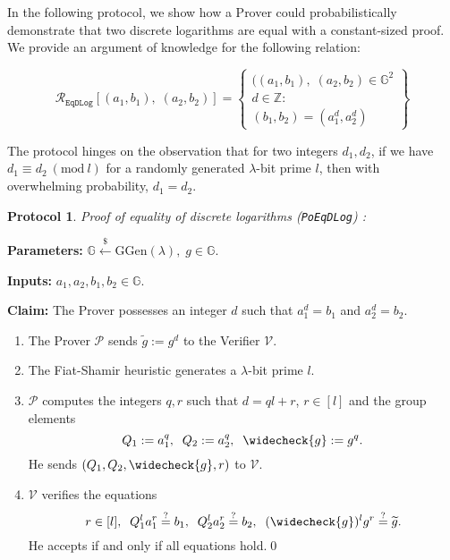 \documentclass[11pt, lettersize, notitlepage, leqno, footskip=0.6cm]{article}
\newcommand{\ttt}{\texttt}
\newcommand{\wti}{\widetilde}
\newcommand{\mc}{\mathcal}
\newcommand{\mb}{\mathbb}
\newcommand{\mr}{\mathrm}
\newcommand{\lam}{\lambda}
\newcommand{\lamb}{\lambda}
\newcommand{\weck}{\widecheck}
\newcommand{\vs}{\vspace{-0.15cm}}
\newcommand{\noin}{\noindent}
\newcommand{\op}{overwhelming probability}
\newcommand{\sta}{\stackrel{?}{=}}
\newcommand{\Mod}[1]{\ (\mathrm{mod}\ #1)}
\newtheorem{Prot}[Thm]{Protocol}
\numberwithin{equation}{section}
\begin{document}
In the following protocol, we show how a Prover could probabilistically demonstrate that two discrete logarithms are equal with a constant-sized proof. We provide an argument of knowledge for  the following relation:

\[
  \mc{R}_{\ttt{EqDLog}}[(a_1, b_1),\;(a_2,b_2)] = \left\{\begin{array}{l}
    ((a_1, b_1),\; (a_2,b_2)\in\mb{G}^2\\
    d\in\mb{Z}: \\
    (b_1,b_2) = (a_1^d,a_2^d)
  \end{array}\right\}
\]

\noin The protocol hinges on the observation that for two integers $d_1,d_2$, if we have $d_1\equiv d_2\Mod{l}$ for a randomly generated $\lam$-bit prime $l$, then with \op, $d_1= d_2$.

\vspace{0.15cm}


\begin{Prot}\label{EqDLog} \normalfont \textit{Proof of equality of discrete logarithms} (\verb|PoEqDLog|) :\end{Prot} \vspace{-0.3cm}

\noindent \textbf{Parameters:} $\mb{G}\xleftarrow{\$} \mr{GGen}(\lamb), \; g\in \mb{G}$.

\noindent \textbf{Inputs:} $a_1, a_2, b_1, b_2 \in \mb{G}$.

\noindent \textbf{Claim:} The Prover possesses an integer $d$ such that $a_1^d = b_1$ and $a_2^d = b_2$.

\begin{enumerate}[wide, labelwidth=!, labelindent=0pt]\vs \item The Prover $\mc{P}$ sends $\wti{g} := g^d$ to the Verifier $\mc{V}$. \vs

\item The Fiat-Shamir heuristic generates a $\lamb$-bit prime $l$. \vs

\item $\mc{P}$ computes the integers $q, r$ such that $d = ql+r$, $r\in [l]$ and the group elements \vs $$Q_1:= a_1^q,\;\; Q_2:= a_2^q,\;\; \weck{g}:= g^q.$$ He sends $(Q_1, Q_2, \weck{g}, r)$ to $\mc{V}$. \vs

\item $\mc{V}$ verifies the equations \vs $$r\in [l],\;\;Q_1^la_1^r \sta  b_1, \;\; Q_2^la_2^r \sta  b_2, \;\; (\weck{g})^lg^r \sta \wti{g}.$$ He accepts if and only if all equations hold.\qed \end{enumerate}
\end{document}
